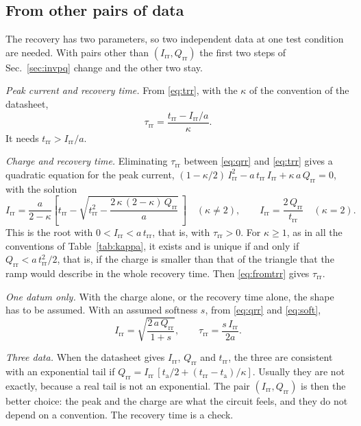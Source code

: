\documentclass[10pt,a4paper]{scrartcl}
\newcommand{\Irr}{I_\mathrm{rr}}
\newcommand{\Qrr}{Q_\mathrm{rr}}
\newcommand{\trr}{t_\mathrm{rr}}
\newcommand{\ta}{t_\mathrm{a}}
\newcommand{\taurr}{\tau_\mathrm{rr}}
\begin{document}
\subsection{From other pairs of data}
\label{sec:pairs}
The recovery has two parameters, so two independent data at one test condition are needed. With pairs other than $(\Irr, \Qrr)$ the first two steps of Sec.~\ref{sec:invpq} change and the other two stay.

\emph{Peak current and recovery time.} From \eqref{eq:trr}, with the $\kappa$ of the convention of the datasheet,
\begin{equation}
\taurr = \frac{\trr - \Irr/a}{\kappa} .
\label{eq:fromtrr}
\end{equation}
It needs $\trr > \Irr/a$.

\emph{Charge and recovery time.} Eliminating $\taurr$ between \eqref{eq:qrr} and \eqref{eq:trr} gives a quadratic equation for the peak current, $(1-\kappa/2)\,\Irr^2 - a\,\trr\,\Irr + \kappa\,a\,\Qrr = 0$, with the solution
\begin{equation}
\Irr = \frac{a}{2-\kappa}\left[\trr - \sqrt{\trr^2 - \frac{2\,\kappa\,(2-\kappa)\,\Qrr}{a}}\,\right] \quad (\kappa \neq 2) , \qquad \Irr = \frac{2\,\Qrr}{\trr} \quad (\kappa = 2) .
\label{eq:fromqt}
\end{equation}
This is the root with $0 < \Irr < a\,\trr$, that is, with $\taurr > 0$. For $\kappa \geq 1$, as in all the conventions of Table~\ref{tab:kappa}, it exists and is unique if and only if $\Qrr < a\,\trr^2/2$, that is, if the charge is smaller than that of the triangle that the ramp would describe in the whole recovery time. Then \eqref{eq:fromtrr} gives $\taurr$.

\emph{One datum only.} With the charge alone, or the recovery time alone, the shape has to be assumed. With an assumed softness $s$, from \eqref{eq:qrr} and \eqref{eq:soft},
\begin{equation}
\Irr = \sqrt{\frac{2\,a\,\Qrr}{1+s}} , \qquad \taurr = \frac{s\,\Irr}{2a} .
\label{eq:fromq}
\end{equation}

\emph{Three data.} When the datasheet gives $\Irr$, $\Qrr$ and $\trr$, the three are consistent with an exponential tail if $\Qrr = \Irr\,[\ta/2 + (\trr-\ta)/\kappa]$. Usually they are not exactly, because a real tail is not an exponential. The pair $(\Irr, \Qrr)$ is then the better choice: the peak and the charge are what the circuit feels, and they do not depend on a convention. The recovery time is a check.
\end{document}

